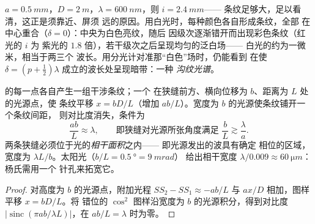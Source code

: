 \begin{example}[数值，以及白光]\label{ex:b2:two-wave-interference:numbers}
$a = \qty{0.5}{mm}$，$D = \qty{2}{m}$，$\lambda = \qty{600}{nm}$，则 $i = \qty{2.4}{mm}$——
条纹足够大，足以看清，这正是须靠近、屏须
远的原因。用白光时，每种颜色各自形成条纹，全部
在中心重合（$\delta = 0$）：中央为白色亮纹，随后
因级次逐渐错开而出现彩色条纹（红光的 $i$ 为
紫光的 $1.8$ 倍），若干级次之后呈现均匀的泛白场——
白光的约为一微米，相当于两三个
波长。用分光计对准那“白色”场时，仍能看到
在使 $\delta = (p + \tfrac12)\lambda$ 成立的波长处呈现暗带：一种
\emph{沟纹光谱}。
\end{example}

\begin{proposition}\label{prop:b2:two-wave-interference:spatial}
的每一点各自产生一组干涉条纹；一个
在狭缝前方、横向位移为 $b$、距离为 $L$ 处的光源点，使
条纹平移 $x = bD/L$（增加
$ab/L$）。宽度为 $b$ 的光源使条纹铺开一个条纹间距，
则对比度消失，条件为
\[
\frac{ab}L \approx \lambda , \qquad\text{即狭缝对光源所张角度满足 } \frac bL \gtrsim \frac\lambda a .
\]
两条狭缝必须位于光的\emph{相干面积}之内——
即光源发出的波具有确定
相位的区域，宽度为 $\lambda L/b$。太阳光（$b/L = \qty{0.5}{\degree} = \qty{9}{mrad}$）
给出相干宽度 $\lambda/0.009 \approx \qty{60}{\micro m}$：杨氏需用一个
针孔来拓宽它。
\end{proposition}

\begin{proof}
对高度为 $b$ 的光源点，附加光程 $SS_2 - SS_1 \approx -ab/L$
与 $ax/D$ 相加，图样平移 $x = bD/L$。将
错位的 $\cos^2$ 图样沿宽度为 $b$ 的光源积分，得到对比度
$|\operatorname{sinc}(\pi ab/\lambda L)|$，在 $ab/L = \lambda$ 时为零。
\end{proof}

